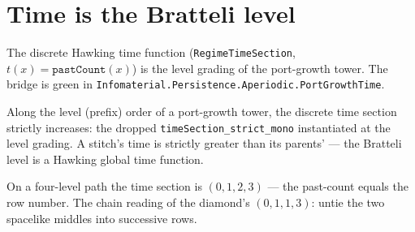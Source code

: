 \section{Time is the Bratteli level}

The discrete Hawking time function (\texttt{RegimeTimeSection}, $t(x) = \texttt{pastCount}(x)$) is the
level grading of the port-growth tower. The bridge is green in \texttt{Infomaterial.Persistence.Aperiodic.PortGrowthTime}.

\begin{theorem}\label{thm:weaving-advances-time}\leanok{}
Along the level (prefix) order of a port-growth tower, the discrete time section strictly increases:
the dropped \texttt{timeSection\_strict\_mono} instantiated at the level grading. A stitch's time is
strictly greater than its parents' --- the Bratteli level is a Hawking global time function.
\end{theorem}

\begin{theorem}\label{thm:time-is-level}\leanok{}
On a four-level path the time section is $(0,1,2,3)$ --- the past-count equals the row number. The
chain reading of the diamond's $(0,1,1,3)$: untie the two spacelike middles into successive rows.
\end{theorem}
